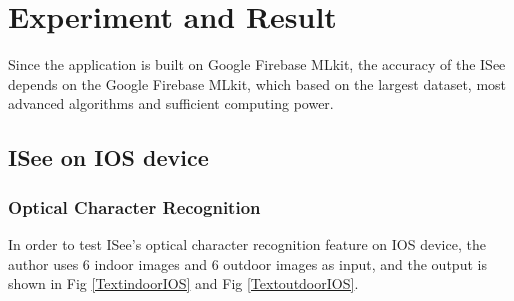 \documentclass[11pt]{ucscthesis}
\begin{document}
\chapter{Experiment and Result}

Since the application is built on Google Firebase MLkit, the accuracy of the ISee depends on the Google Firebase MLkit, which based on the largest dataset, most advanced algorithms and sufficient computing power.

\section{ISee on IOS device}
\subsection{Optical Character Recognition}

In order to test ISee's optical character recognition feature on IOS device, the author uses 6 indoor images and 6 outdoor images as input, and the output is shown in Fig \ref{TextindoorIOS} and Fig \ref{TextoutdoorIOS}.
\end{document}
